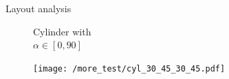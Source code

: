 \documentclass[aspectratio=169,xcolor=dvipsnames]{beamer}
\begin{document}
\begin{frame}{Layout analysis}
\begin{figure}
\begin{minipage}{\linewidth}
\end{minipage}\vspace{10pt}
\begin{minipage}{\linewidth}
				\begin{minipage}{0.1\textwidth}
		\tiny{Cylinder with\\ $\alpha \in [0,90]$}
	\end{minipage}\hfill
\begin{minipage}{0.2\textwidth}
	\centering
\end{minipage}\hfill
	\begin{minipage}{0.2\textwidth}
		\centering
	\end{minipage}\hfill
		\begin{minipage}{0.2\textwidth}
			\centering
		\end{minipage}\hfill
				\begin{minipage}{0.2\textwidth}
				\centering
			\end{minipage}\hfill
\end{minipage}
\begin{minipage}{\linewidth}
	
	\begin{minipage}{0.2\textwidth}
		\centering
		\texttt{[image: /more\_test/cyl\_30\_45\_30\_45.pdf]}
	\end{minipage}\hfill
	\begin{minipage}{0.2\textwidth}
		\centering
	\fontsize{4}{4}
	\end{minipage}\hfill
	\begin{minipage}{0.2\textwidth}
		\centering
	\end{minipage}\hfill
	\begin{minipage}{0.2\textwidth}
		\centering
	\end{minipage}\hfill
\end{minipage}


	\end{figure}

\end{frame}
\end{document}
